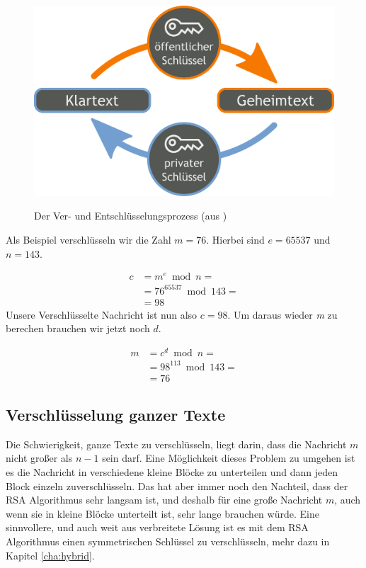 \documentclass[12pt,a4paper]{scrartcl}
\begin{document}
	\begin{figure}
	\includegraphics[scale=0.05]{Orange_blue_public_key_cryptography_de.svg.png} \\
	\caption{Der Ver- und Entschlüsselungsprozess (aus \cite{wikipedia})}
	\label{fig:figure1}
	\end{figure}
	
	Als Beispiel verschlüsseln wir die Zahl $m = 76$. Hierbei sind $e=65537$ und $n=143$.

	\begin{equation}
	\begin{split}
	c & = m^e \bmod n = \\
	 &  = 76^{65537} \bmod 143 = \\
 	& = 98
	\end{split}
	\end{equation}
	Unsere Verschlüsselte Nachricht ist nun also $c = 98$. Um daraus wieder \textit{m} zu berechen brauchen wir jetzt noch $d$.

	\begin{equation}
	\begin{split}
	m & = c^d \bmod n = \\
	 &  = 98^{113} \bmod 143 = \\
 	& = 76
	\end{split}
	\end{equation}


	\subsection{Verschlüsselung ganzer Texte}
		\label{cha:hole_text}

	Die Schwierigkeit, ganze Texte zu verschlüsseln, liegt darin, dass die Nachricht $m$ nicht großer als $n - 1$ sein darf. Eine Möglichkeit dieses Problem zu umgehen ist es die Nachricht in verschiedene kleine Blöcke zu unterteilen und dann jeden Block einzeln zuverschlüsseln. Das hat aber immer noch den Nachteil, dass der RSA Algorithmus sehr langsam ist, und deshalb für eine große Nachricht $m$, auch wenn sie in kleine Blöcke unterteilt ist, sehr lange brauchen würde. Eine sinnvollere, und auch weit aus verbreitete Lösung ist es mit dem RSA Algorithmus einen symmetrischen Schlüssel zu verschlüsseln, mehr dazu in Kapitel \ref{cha:hybrid}.
\end{document}
